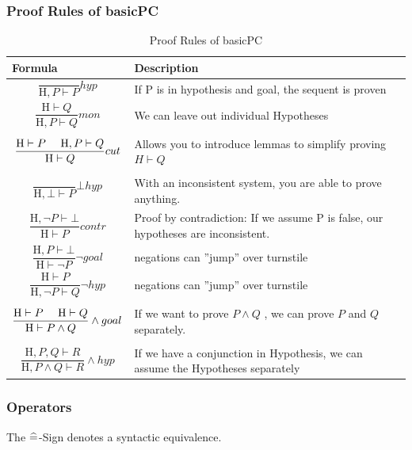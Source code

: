 \subsubsection{Proof Rules of basicPC}
\begin{table}[h]
	\centering
	\begin{tabu} to \linewidth {l X}
		\toprule
		Formula & Description \\
		\midrule
		\tabmath\[\frac{}{\text{H},P \vdash P} hyp \] &
			If P is in hypothesis and goal, the sequent is proven \\
		\tabmath\[ \frac{\text{H} \vdash Q}{\text{H},P \vdash Q} mon \] &
			We can leave out individual Hypotheses \\
		\tabmath\[ \frac{\text{H} \vdash P \text{ }\text{ }\text{ }\text{ } \text{H}, P \vdash Q}{\text{H} \vdash Q} cut \] &
			Allows you to introduce lemmas to simplify proving  $H \vdash Q$ \\
		\tabmath\[ \frac{}{\text{H}, \bot \vdash P} \bot hyp \] &
			With an inconsistent system, you are able to prove anything. \\
		\tabmath\[ \frac{\text{H}, \neg P \vdash \bot}{\text{H} \vdash P} contr \] &
			Proof by contradiction: If we assume P is false, our hypotheses are inconsistent. \\
		\tabmath\[ \frac{\text{H}, P \vdash \bot}{\text{H} \vdash \neg P} \neg goal \] &
			negations can ''jump'' over turnstile \\
		\tabmath\[ \frac{\text{H} \vdash P}{\text{H}, \neg P \vdash Q} \neg hyp \] &
			negations can ''jump'' over turnstile \\
		\tabmath\[ \frac{\text{H} \vdash P \text{ }\text{ }\text{ }\text{ } \text{H} \vdash Q}{\text{H} \vdash P \land Q} \land goal \] &
			If we want to prove $P \land Q$ , we can prove $P$ and $Q$ separately. \\
		\tabmath\[ \frac{\text{H},P,Q \vdash R}{\text{H},P \land Q \vdash R} \land hyp \] &
			If we have a conjunction in Hypothesis, we can assume the Hypotheses separately \\
		\bottomrule
	\end{tabu}
	\label{tbl:ProofRulesBasicPC}
	\caption{Proof Rules of basicPC}
\end{table}


\subsubsection{Operators}

The $\widehat{=}$-Sign denotes a syntactic equivalence.


